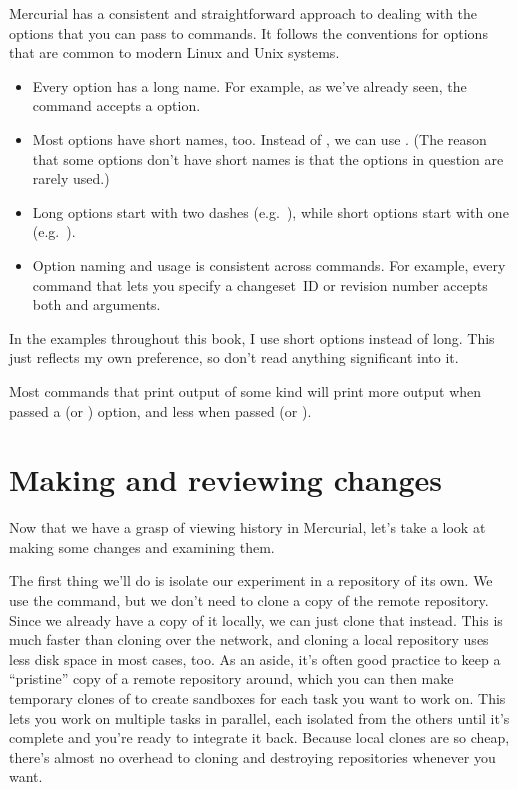 Mercurial has a consistent and straightforward approach to dealing
with the options that you can pass to commands.  It follows the
conventions for options that are common to modern Linux and Unix
systems.
\begin{itemize}
\item Every option has a long name.  For example, as we've already
  seen, the  command accepts a  option.
\item Most options have short names, too.  Instead of
  , we can use .  (The reason that
  some options don't have short names is that the options in question
  are rarely used.)
\item Long options start with two dashes (e.g.~),
  while short options start with one (e.g.~).
\item Option naming and usage is consistent across commands.  For
  example, every command that lets you specify a changeset~ID or
  revision number accepts both  and 
  arguments.
\end{itemize}
In the examples throughout this book, I use short options instead of
long.  This just reflects my own preference, so don't read anything
significant into it.

Most commands that print output of some kind will print more output
when passed a  (or ) option, and less
when passed  (or ).

\section{Making and reviewing changes}

Now that we have a grasp of viewing history in Mercurial, let's take a
look at making some changes and examining them.

The first thing we'll do is isolate our experiment in a repository of
its own.  We use the  command, but we don't need to
clone a copy of the remote repository.  Since we already have a copy
of it locally, we can just clone that instead.  This is much faster
than cloning over the network, and cloning a local repository uses
less disk space in most cases, too.
As an aside, it's often good practice to keep a ``pristine'' copy of a
remote repository around, which you can then make temporary clones of
to create sandboxes for each task you want to work on.  This lets you
work on multiple tasks in parallel, each isolated from the others
until it's complete and you're ready to integrate it back.  Because
local clones are so cheap, there's almost no overhead to cloning and
destroying repositories whenever you want.

